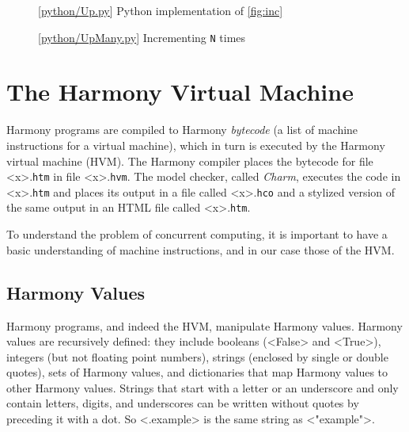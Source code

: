 \documentclass{report}
\newcommand{\harmonylink}[1]{%
[\href{https://harmony.cs.cornell.edu/#1}{\underline{#1}}]%
}
\newenvironment{code}{
\tcolorbox
}{
\endtcolorbox
}
\begin{document}
\begin{figure}
\begin{code}
\end{code}
\caption{\harmonylink{python/Up.py} Python implementation of \autoref{fig:inc}}
\label{fig:incpy}
\end{figure}

\begin{figure}
\begin{code}
\end{code}
\caption{\harmonylink{python/UpMany.py} Incrementing \texttt{N} times}
\label{fig:incmany}
\end{figure}

\chapter{The Harmony Virtual Machine}
\label{ch:harmonymachine}
%

Harmony programs are compiled to Harmony \emph{bytecode}
%
(a list of machine instructions for a virtual machine),
which in turn is executed by the Harmony virtual machine (HVM).
%
%
%
The Harmony compiler places the bytecode for file <{x}>.\texttt{htm} in
file <{x}>.\texttt{hvm}.
The model checker, called \emph{Charm}, executes the code in
<{x}>.\texttt{htm} and places its output in a file
called <{x}>.\texttt{hco} and a stylized version of the same output
in an HTML file called <{x}>.\texttt{htm}.

To understand the problem of concurrent computing, it
is important to have a basic understanding of machine instructions,
and in our case those of the HVM.

\section*{Harmony Values}

Harmony programs, and indeed the HVM,  manipulate Harmony values.
Harmony values are recursively defined:
they include booleans (<{False}> and <{True}>),
integers (but not floating point numbers),
strings (enclosed by single or double quotes),
sets of Harmony values, and dictionaries
%
that map Harmony values to other Harmony values.
Strings that start with a letter or an underscore and only contain
letters, digits, and underscores can be written without quotes by
preceding it with a dot.  So <{.example}> is the same string
as <{"example"}>.
\end{document}
